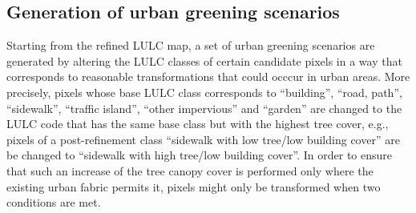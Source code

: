 \documentclass[10pt,letterpaper]{article}
\begin{document}



\subsection*{Generation of urban greening scenarios}

Starting from the refined LULC map, a set of urban greening scenarios are generated by altering the LULC classes of certain candidate pixels in a way that corresponds to reasonable transformations that could occcur in urban areas.
More precisely, pixels whose base LULC class corresponds to ``building'', ``road, path'', ``sidewalk'', ``traffic island'', ``other impervious'' and ``garden'' are changed to the LULC code that has the same base class but with the highest tree cover, e.g.,  pixels of a post-refinement class ``sidewalk with low tree/low building cover'' are be changed to ``sidewalk with high tree/low building cover''.
In order to ensure that such an increase of the tree canopy cover is performed only where the existing urban fabric permits it, pixels might only be transformed when two conditions are met.
\end{document}
